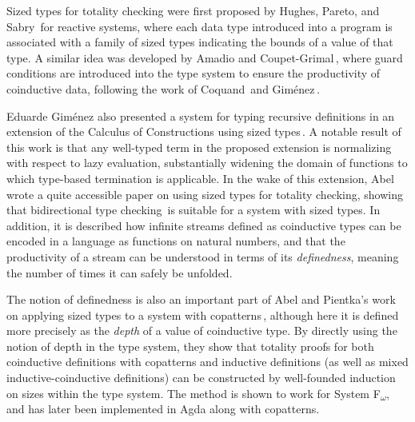 Sized types for totality checking were first proposed by Hughes, Pareto, and Sabry\,\citep{Hughes96} for reactive systems, where each data type introduced into a program is associated with a family of sized types indicating the bounds of a value of that type. A similar idea was developed by Amadio and Coupet-Grimal\,\citep{Amadio98}, where guard conditions are introduced into the type system to ensure the productivity of coinductive data, following the work of Coquand\,\citep{Coquand94} and Gim\'{e}nez\,\citep{Gimenez95}.

Eduarde Gim\'{e}nez also presented a system for typing recursive definitions in an extension of the Calculus of Constructions using sized types\,\citep{Gimenez98structuralrecursive}. A notable result of this work is that any well-typed term in the proposed extension is normalizing with respect to lazy evaluation, substantially widening the domain of functions to which type-based termination is applicable. In the wake of this extension, Abel\,\citep{Abel99terminationchecking} wrote a quite accessible paper on using sized types for totality checking, showing that bidirectional type checking\,\citep{Pierce00} is suitable for a system with sized types. In addition, it is described how infinite streams defined as coinductive types can be encoded in a language as functions on natural numbers, and that the productivity of a stream can be understood in terms of its \emph{definedness}, meaning the number of times it can safely be unfolded.

The notion of definedness is also an important part of Abel and Pientka's work on applying sized types to a system with copatterns\,\citep{Abel13Wellfounded}, although here it is defined more precisely as the \emph{depth} of a value of coinductive type. By directly using the notion of depth in the type system, they show that totality proofs for both coinductive definitions with copatterns and inductive definitions (as well as mixed inductive-coinductive definitions) can be constructed by well-founded induction on sizes within the type system. The method is shown to work for System F\textsubscript{$\omega$}, and has later been implemented in Agda along with copatterns.


